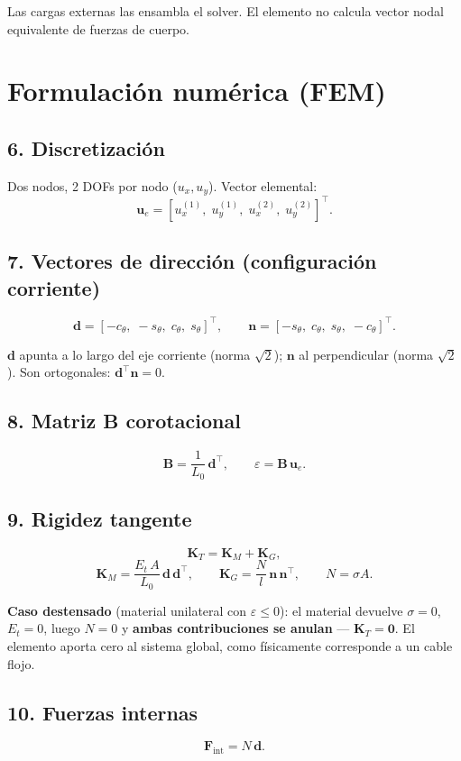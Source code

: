 \documentclass[11pt,letterpaper,oneside]{report}
\begin{document}
Las cargas externas las ensambla el solver. El elemento no calcula vector nodal equivalente de fuerzas de cuerpo.


\section{Formulación numérica (FEM)}

\subsection{6. Discretización}
Dos nodos, 2 DOFs por nodo ($u_x, u_y$). Vector elemental:
\[
\mathbf u_e = [u_x^{(1)},\; u_y^{(1)},\; u_x^{(2)},\; u_y^{(2)}]^\top.
\]

\subsection{7. Vectores de dirección (configuración corriente)}
\[
\mathbf d = [-c_\theta,\; -s_\theta,\; c_\theta,\; s_\theta]^\top, \qquad \mathbf n = [-s_\theta,\; c_\theta,\; s_\theta,\; -c_\theta]^\top.
\]

$\mathbf d$ apunta a lo largo del eje corriente (norma $\sqrt 2$); $\mathbf n$ al perpendicular (norma $\sqrt 2$). Son ortogonales: $\mathbf d^\top\mathbf n = 0$.

\subsection{8. Matriz B corotacional}
\[
\mathbf B = \frac{1}{L_0}\,\mathbf d^\top, \qquad \varepsilon = \mathbf B\,\mathbf u_e.
\]

\subsection{9. Rigidez tangente}
\[
\mathbf K_T = \mathbf K_M + \mathbf K_G,
\]
\[
\mathbf K_M = \frac{E_t\,A}{L_0}\,\mathbf d\,\mathbf d^\top, \qquad \mathbf K_G = \frac{N}{l}\,\mathbf n\,\mathbf n^\top, \qquad N = \sigma A.
\]

\textbf{Caso destensado} (material unilateral con $\varepsilon \leq 0$): el material devuelve $\sigma = 0$, $E_t = 0$, luego $N = 0$ y \textbf{ambas contribuciones se anulan} --- $\mathbf K_T = \mathbf 0$. El elemento aporta cero al sistema global, como físicamente corresponde a un cable flojo.

\subsection{10. Fuerzas internas}
\[
\mathbf F_{\text{int}} = N\,\mathbf d.
\]
\end{document}
